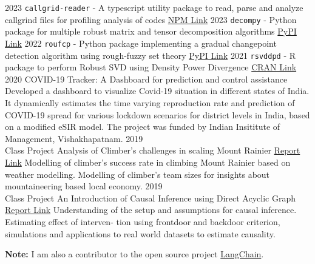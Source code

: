 \documentclass[9pt]{developercv} %
\begin{document}
\begin{entrylist}
    \vspace{-10pt}
    \entry
    {2023}
    {\texttt{callgrid-reader} - A typescript utility package to read, parse and analyze callgrind files for profiling analysis of codes}
    {\href{https://www.npmjs.com/package/callgrind-reader}{NPM Link}}
    {}
    \vspace{-10pt}
    \entry
    {2023}
    {\texttt{decompy} - Python package for multiple robust matrix and tensor decomposition algorithms}
    {\href{https://pypi.org/project/decompy/}{PyPI Link}}
    {}
    \vspace{-10pt}
    \entry
    {2022}
    {\texttt{roufcp} - Python package implementing a gradual changepoint detection algorithm using rough-fuzzy set theory}
    {\href{https://pypi.org/project/roufcp/}{PyPI Link}}
    {}
    \vspace{-10pt}
    \entry
    {2021}
    {\texttt{rsvddpd} - R package to perform Robust SVD using Density Power Divergence}
    {\href{https://cran.r-project.org/web/packages/rsvddpd/index.html}{CRAN Link}}
    {}
    \entry
    {2020}
    {COVID-19 Tracker: A Dashboard for prediction and control assistance}
    {}
    {\small Developed a dashboard to visualize Covid-19 situation in different states of India. It dynamically estimates the time varying reproduction rate and prediction of COVID-19 spread for various lockdown scenarios for district levels in India, based on a modified eSIR model. The project was funded by Indian Insititute of Management, Vishakhapatnam.}
    \entry
    {2019\\Class Project}
    {Analysis of Climber's challenges in scaling Mount Rainier}
    {\href{https://github.com/subroy13/mount-rainier-case-study}{Report Link} }
    {\small Modelling of climber's success rate in climbing Mount Rainier based on weather modelling. Modelling of climber's team sizes for insights about mountaineering based local economy.}
    \entry
    {2019\\Class Project}
    {An Introduction of Causal Inference using Direct Acyclic Graph}
    {\href{https://www.statwizard.in/aboutme/causal-dag/final-report.pdf}{Report Link} }
    {\small Understanding of the setup and assumptions for causal inference. Estimating effect of interven-
        tion using frontdoor and backdoor criterion, simulations and applications to real world datasets to estimate
        causality.}
\end{entrylist}
\vspace*{0.2cm}
{\small\textbf{Note:} I am also a contributor to the open source project \href{https://github.com/langchain-ai/langchain}{LangChain}}.
\end{document}
